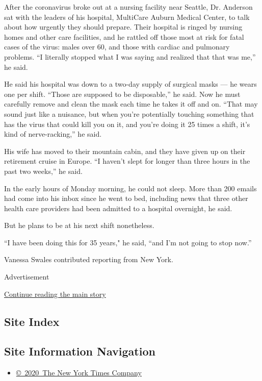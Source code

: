 After the coronavirus broke out at a nursing facility near Seattle, Dr.
Anderson sat with the leaders of his hospital, MultiCare Auburn Medical
Center, to talk about how urgently they should prepare. Their hospital
is ringed by nursing homes and other care facilities, and he rattled off
those most at risk for fatal cases of the virus: males over 60, and
those with cardiac and pulmonary problems. ``I literally stopped what I
was saying and realized that that was me,'' he said.

He said his hospital was down to a two-day supply of surgical masks ---
he wears one per shift. ``Those are supposed to be disposable,'' he
said. Now he must carefully remove and clean the mask each time he takes
it off and on. ``That may sound just like a nuisance, but when you're
potentially touching something that has the virus that could kill you on
it, and you're doing it 25 times a shift, it's kind of nerve-racking,''
he said.

His wife has moved to their mountain cabin, and they have given up on
their retirement cruise in Europe. ``I haven't slept for longer than
three hours in the past two weeks,'' he said.

In the early hours of Monday morning, he could not sleep. More than 200
emails had come into his inbox since he went to bed, including news that
three other health care providers had been admitted to a hospital
overnight, he said.

But he plans to be at his next shift nonetheless.

``I have been doing this for 35 years," he said, ``and I'm not going to
stop now.''

Vanessa Swales contributed reporting from New York.

Advertisement

\protect\hyperlink{after-bottom}{Continue reading the main story}

\hypertarget{site-index}{%
\subsection{Site Index}\label{site-index}}

\hypertarget{site-information-navigation}{%
\subsection{Site Information
Navigation}\label{site-information-navigation}}

\begin{itemize}
\tightlist
\item
  \href{https://help.nytimes3xbfgragh.onion/hc/en-us/articles/115014792127-Copyright-notice}{©~2020~The
  New York Times Company}
\end{itemize}

